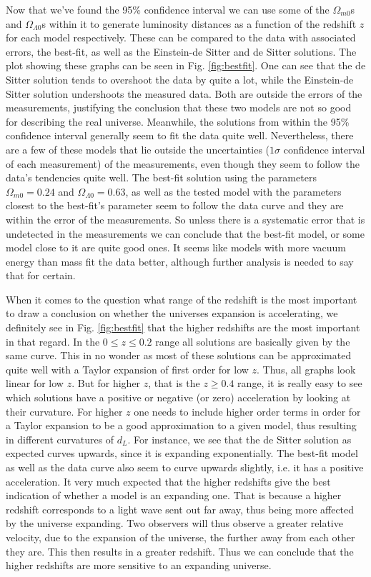 \documentclass{emulateapj}
\begin{document}
 	Now that we've found the 95\% confidence interval we can use some of the $\Omega_{m 0}$s and $\Omega_{\Lambda 0}$s within it to generate luminosity distances as a function of the redshift $z$ for each model respectively. These can be compared to the data with associated errors, the best-fit, as well as the Einstein-de Sitter and de Sitter solutions. The plot showing these graphs can be seen in Fig. \ref{fig:bestfit}. One can see that the de Sitter solution tends to overshoot the data by quite a lot, while the Einstein-de Sitter solution undershoots the measured data. Both are outside the errors of the measurements, justifying the conclusion that these two models are not so good for describing the real universe. Meanwhile, the solutions from within the 95\% confidence interval generally seem to fit the data quite well. Nevertheless, there are a few of these models that lie outside the uncertainties ($1\sigma$ confidence interval of each measurement) of the measurements, even though they seem to follow the data's tendencies quite well. The best-fit solution using the parameters $\Omega_{m 0} = 0.24$ and $\Omega_{\Lambda 0} = 0.63$, as well as the tested model with the parameters closest to the best-fit's parameter seem to follow the data curve and they are within the error of the measurements. So unless there is a systematic error that is undetected in the measurements we can conclude that the best-fit model, or some model close to it are quite good ones. It seems like models with more vacuum energy than mass fit the data better, although further analysis is needed to say that for certain.
 	
 	When it comes to the question what range of the redshift is the most important to draw a conclusion on whether the universes expansion is accelerating, we definitely see in Fig. \ref{fig:bestfit} that the higher redshifts are the most important in that regard. In the $0\leq z\leq 0.2$ range all solutions are basically given by the same curve. This in no wonder as most of these solutions can be approximated quite well with a Taylor expansion of first order for low $z$. Thus, all graphs look linear for low $z$. But for higher $z$, that is the $z\geq 0.4$ range, it is really easy to see which solutions have a positive or negative (or zero) acceleration by looking at their curvature. For higher $z$ one needs to include higher order terms in order for a Taylor expansion to be a good approximation to a given model, thus resulting in different curvatures of $d_L$. For instance, we see that the de Sitter solution as expected curves upwards, since it is expanding exponentially. The best-fit model as well as the data curve also seem to curve upwards slightly, i.e. it has a positive acceleration. It very much expected that the higher redshifts give the best indication of whether a model is an expanding one. That is because a higher redshift corresponds to a light wave sent out far away, thus being more affected by the universe expanding. Two observers will thus observe a greater relative velocity, due to the expansion of the universe, the further away from each other they are. This then results in a greater redshift. Thus we can conclude that the higher redshifts are more sensitive to an expanding universe.
 	
\end{document}

